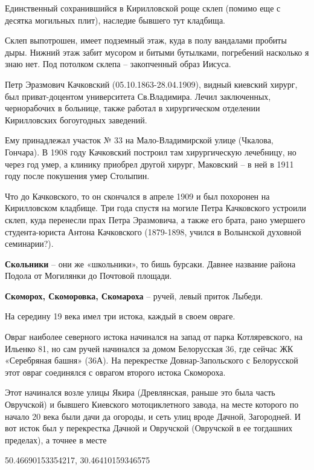 Единственный сохранившийся в Кирилловской роще склеп (помимо еще с десятка могильных плит), наследие бывшего тут кладбища.

Склеп выпотрошен, имеет подземный этаж, куда в полу вандалами пробиты дыры. Нижний этаж забит мусором и битыми бутылками, погребений насколько я знаю нет. Под потолком склепа – закопченный образ Иисуса.

Петр Эразмович Качковский (05.10.1863-28.04.1909), видный киевский хирург, был при\-ват-доцентом университета Св.Владимира. Лечил заключенных, чернорабочих в больнице, также работал в хирургическом отделении Кирилловских богоугодных заведений.

Ему принадлежал участок № 33 на Мало-Владимирской улице (Чкалова, Гончара). В 1908 году Качковский построил там хирургическую лечебницу, но через год умер, а клинику приобрел другой хирург, Маковский – в ней в 1911 году после покушения умер Столыпин.

Что до Качковского, то он скончался в апреле 1909 и был похоронен на Кирилловском кладбище. Три года спустя на могиле Петра Качковского устроили склеп, куда перенесли прах Петра Эразмовича, а также его брата, рано умершего студента-юриста Антона Качковского (1879-1898, учился в Волынской духовной семинарии?).\\

\medskip


\textbf{Скольники} – они же «школьники», то бишь бурсаки. Давнее название района Подола от Могилянки до Почтовой площади.\\

\medskip


\textbf{Скоморох, Скоморовка, Скомароха} – ручей, левый приток Лыбеди. 

На середину 19 века имел три истока, каждый в своем овраге.

Овраг наиболее северного истока начинался на запад от парка Котляревского, на Ильенко 81, но сам ручей начинался за домом Белорусская 36, где сейчас ЖК «Серебряная башня» (36А). На перекрестке Довнар-Запольского с Белорусской этот овраг соединялся с оврагом второго истока Скомороха.

Этот начинался возле улицы Якира (Древлянская, раньше это была часть Овручской) и бывшего Киевского мотоциклетного завода, на месте которого по начало 20 века были дачи да огороды, и сеть улиц вроде Дачной, Загородней. И вот исток был у перекрестка Дачной и Овручской (Овручской в ее тогдашних пределах), а точнее в месте 

50.46690153354217, 30.46410159346575

